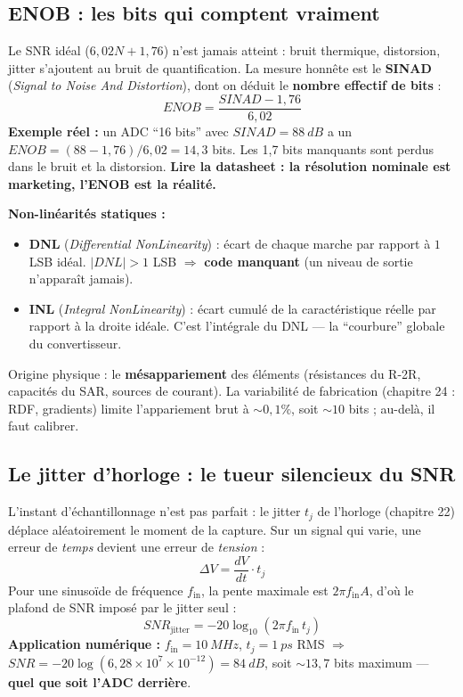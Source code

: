 \documentclass[12pt,a4paper,twoside]{book}
\begin{document}
\subsection{ENOB : les bits qui comptent vraiment}

\begin{formule}
Le SNR idéal ($6{,}02N + 1{,}76$) n'est jamais atteint : bruit thermique, distorsion, jitter s'ajoutent au bruit de quantification. La mesure honnête est le \textbf{SINAD} (\textit{Signal to Noise And Distortion}), dont on déduit le \textbf{nombre effectif de bits} :
\[
\boxed{ENOB = \frac{SINAD - 1{,}76}{6{,}02}}
\]
\textbf{Exemple réel :} un ADC ``16 bits'' avec $SINAD = \SI{88}{dB}$ a un $ENOB = (88-1{,}76)/6{,}02 = 14{,}3$ bits. Les 1,7 bits manquants sont perdus dans le bruit et la distorsion. \textbf{Lire la datasheet : la résolution nominale est marketing, l'ENOB est la réalité.}
\end{formule}

\begin{formule}
\textbf{Non-linéarités statiques :}
\begin{itemize}[nosep]
\item \textbf{DNL} (\textit{Differential NonLinearity}) : écart de chaque marche par rapport à $1$ LSB idéal. $|DNL| > 1$ LSB $\Rightarrow$ \textbf{code manquant} (un niveau de sortie n'apparaît jamais).
\item \textbf{INL} (\textit{Integral NonLinearity}) : écart cumulé de la caractéristique réelle par rapport à la droite idéale. C'est l'intégrale du DNL --- la ``courbure'' globale du convertisseur.
\end{itemize}
Origine physique : le \textbf{mésappariement} des éléments (résistances du R-2R, capacités du SAR, sources de courant). La variabilité de fabrication (chapitre 24 : RDF, gradients) limite l'appariement brut à $\sim 0{,}1\%$, soit $\sim 10$ bits ; au-delà, il faut calibrer.
\end{formule}

\subsection{Le jitter d'horloge : le tueur silencieux du SNR}

\begin{formule}
L'instant d'échantillonnage n'est pas parfait : le jitter $t_j$ de l'horloge (chapitre 22) déplace aléatoirement le moment de la capture. Sur un signal qui varie, une erreur de \textit{temps} devient une erreur de \textit{tension} :
\[
\Delta V = \frac{dV}{dt} \cdot t_j
\]
Pour une sinusoïde de fréquence $f_{\text{in}}$, la pente maximale est $2\pi f_{\text{in}} A$, d'où le plafond de SNR imposé par le jitter seul :
\[
\boxed{SNR_{\text{jitter}} = -20 \log_{10}(2\pi f_{\text{in}} \, t_j)}
\]
\textbf{Application numérique :} $f_{\text{in}} = \SI{10}{MHz}$, $t_j = \SI{1}{ps}$ RMS $\Rightarrow$ $SNR = -20\log(6{,}28\times10^7\times10^{-12}) = \SI{84}{dB}$, soit $\sim 13{,}7$ bits maximum --- \textbf{quel que soit l'ADC derrière}.
\end{formule}
\end{document}
